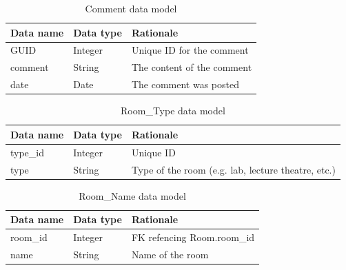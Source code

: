 \documentclass{sig-alt-release2}
\begin{document}


\begin{table}
\begin{tabular}{| p{2cm} | p{2cm} | p{3cm}|}
\hline
Data name & Data type & Rationale \\
\hline
GUID & Integer & Unique ID for the comment\\
\hline
comment & String & The content of the comment\\
\hline
date & Date & The comment was posted\\
\hline
\end{tabular}	
\caption{Comment data model}
\end{table}



\begin{table}
\begin{tabular}{| p{2cm} | p{2cm} | p{3cm}|}
\hline
Data name & Data type & Rationale \\
\hline
type\_id & Integer & Unique ID \\
\hline
type & String & Type of the room (e.g. lab, lecture theatre, etc.)\\
\hline
\end{tabular}	
\caption{Room\_Type data model}
\end{table}



\begin{table}
\begin{tabular}{| p{2cm} | p{2cm} | p{3cm}|}
\hline
Data name & Data type & Rationale \\
\hline
room\_id & Integer & FK refencing Room.room\_id \\
\hline
name & String & Name of the room \\
\hline
\end{tabular}	
\caption{Room\_Name data model}
\end{table}
\end{document}
